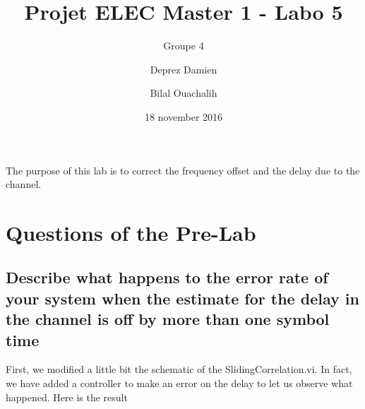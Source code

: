 \documentclass[frenchb, oneside, headings=normal]{scrartcl}
\begin{document}
\title{Projet ELEC Master 1 - Labo 5}
\subtitle{Groupe 4}
\author{Deprez Damien \and Bilal Ouachalih }
\date{18 november 2016}
\maketitle

The purpose of this lab is to correct the frequency offset and the delay due to the channel.

\section{Questions of the Pre-Lab}

\subsection{Describe what happens to the error rate of your system when the estimate for the delay in the channel is off by more than one symbol time}

First, we modified a little bit the schematic of the SlidingCorrelation.vi. In fact, we have added a controller to make an error on the delay to let us observe what happened. Here is the result\\
\end{document}
